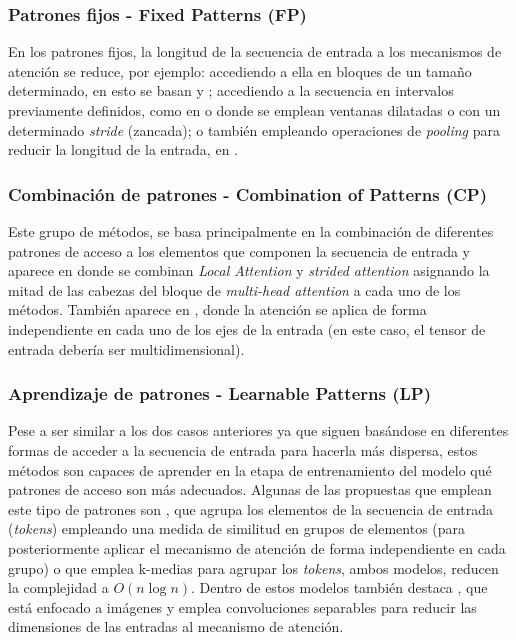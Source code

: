 \subsubsection{Patrones fijos - Fixed Patterns (FP)}
En los patrones fijos, la longitud de la secuencia de entrada a los mecanismos de atención se reduce, por ejemplo: accediendo a ella en bloques de un tamaño determinado, en esto se basan  \cite{qiu-etal-2020-blockwise} y  \cite{localattention}; accediendo a la secuencia en intervalos previamente definidos, como en  \cite{sparse-transformers} o  \cite{beltagy2020longformer} donde se emplean ventanas dilatadas o con un determinado \textit{stride} (zancada); o también empleando operaciones de \textit{pooling} para reducir la longitud de la entrada, en  \cite{j.2018generating}.

\subsubsection{Combinación de patrones - Combination of Patterns (CP)}
Este grupo de métodos, se basa principalmente en la combinación de diferentes patrones de acceso a los elementos que componen la secuencia de entrada y aparece en  \cite{sparse-transformers} donde se combinan \textit{Local Attention} y \textit{strided attention} asignando la mitad de las cabezas del bloque de \textit{multi-head attention} a cada uno de los métodos. También aparece en  \cite{ho2019axial}, donde la atención se aplica de forma independiente en cada uno de los ejes de la entrada (en este caso, el tensor de entrada debería ser multidimensional).

\subsubsection{Aprendizaje de patrones - Learnable Patterns (LP)}
Pese a ser similar a los dos casos anteriores ya que siguen basándose en diferentes formas de acceder a la secuencia de entrada para hacerla más dispersa, estos métodos son capaces de aprender en la etapa de entrenamiento del modelo qué patrones de acceso son más adecuados. Algunas de las propuestas que emplean este tipo de patrones son  \cite{Kitaev2020Reformer:}, que agrupa los elementos de la secuencia de entrada (\textit{tokens}) empleando una medida de similitud en grupos de elementos (para posteriormente aplicar el mecanismo de atención de forma independiente en cada grupo) o  \cite{routingtransformer} que emplea k-medias para agrupar los \textit{tokens}, ambos modelos, reducen la complejidad a $O(n \log n)$. Dentro de estos modelos también destaca  \cite{zhql2021ResT}, que está enfocado a imágenes y emplea convoluciones separables para reducir las dimensiones de las entradas al mecanismo de atención.

